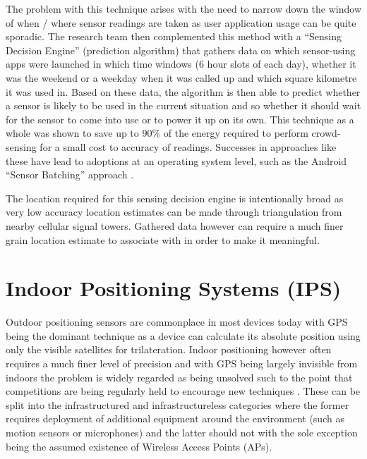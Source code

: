 \documentclass{UoYCSproject}
\begin{document}
            The problem with this technique arises with the need to narrow down the window of when / where sensor readings are taken as user application usage can be quite sporadic. The research team then complemented this method with a ``Sensing Decision Engine'' (prediction algorithm) that gathers data on which sensor-using apps were launched in which time windows (6 hour slots of each day), whether it was the weekend or a weekday when it was called up and which square kilometre it was used in. Based on these data, the algorithm is then able to predict whether a sensor is likely to be used in the current situation and so whether it should wait for the sensor to come into use or to power it up on its own. This technique as a whole was shown to save up to 90\% of the energy required to perform crowd-sensing for a small cost to accuracy of readings. Successes in approaches like these have lead to adoptions at an operating system level, such as the Android ``Sensor Batching'' approach \citep{AndroidSenseBatch}.
            
            The location required for this sensing decision engine is intentionally broad as very low accuracy location estimates can be made through triangulation from nearby cellular signal towers. Gathered data however can require a much finer grain location estimate to associate with in order to make it meaningful.
                
        \section{Indoor Positioning Systems (IPS)}
        \label{sec:ips}
        
            Outdoor positioning sensors are commonplace in most devices today with GPS being the dominant technique as a device can calculate its absolute position using only the visible satellites for trilateration. Indoor positioning however often requires a much finer level of precision and with GPS being largely invisible from indoors the problem is widely regarded as being unsolved such to the point that competitions are being regularly held to encourage new techniques \citep{MSLOCComp}. These can be split into  the infrastructured and infrastructureless categories where the former requires deployment of additional equipment around the environment (such as motion sensors or microphones) and the latter should not with the sole exception being the assumed existence of Wireless Access Points (APs).
            
\end{document}
